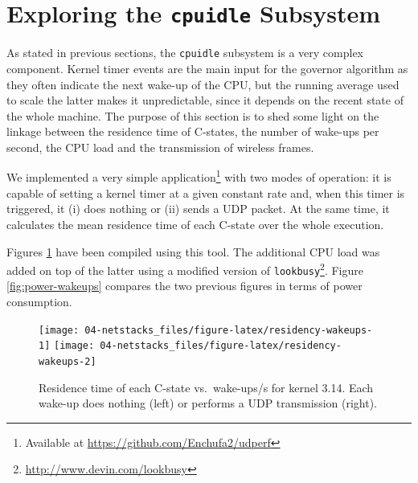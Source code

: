 \documentclass[twoside,nohyper]{tufte-book}
\theoremstyle{definition}
\theoremstyle{definition}
\theoremstyle{definition}
\theoremstyle{remark}
\begin{document}
\hypertarget{exploring-the-cpuidle-subsystem}{%
\section{\texorpdfstring{Exploring the \texttt{cpuidle}
Subsystem}{Exploring the cpuidle Subsystem}}\label{exploring-the-cpuidle-subsystem}}

As stated in previous sections, the \texttt{cpuidle} subsystem is a very
complex component. Kernel timer events are the main input for the
governor algorithm as they often indicate the next wake-up of the CPU,
but the running average used to scale the latter makes it unpredictable,
since it depends on the recent state of the whole machine. The purpose
of this section is to shed some light on the linkage between the
residence time of C-states, the number of wake-ups per second, the CPU
load and the transmission of wireless frames.

We implemented a very simple application\footnote{Available at
  \url{https://github.com/Enchufa2/udperf}} with two modes of operation:
it is capable of setting a kernel timer at a given constant rate and,
when this timer is triggered, it (i) does nothing or (ii) sends a UDP
packet. At the same time, it calculates the mean residence time of each
C-state over the whole execution.

Figures \ref{fig:residency-wakeups} have been compiled using this tool.
The additional CPU load was added on top of the latter using a modified
version of \texttt{lookbusy}\footnote{\url{http://www.devin.com/lookbusy}}.
Figure \ref{fig:power-wakeups} compares the two previous figures in
terms of power consumption.





\begin{figure}

{\centering \texttt{[image: 04-netstacks\_files/figure-latex/residency-wakeups-1]} \texttt{[image: 04-netstacks\_files/figure-latex/residency-wakeups-2]} 

}

\caption[Residence time of each C-state vs.~wake-ups/s
for kernel 3.14. Each wake-up does nothing (left) or performs a UDP
transmission (right).]{Residence time of each C-state vs.~wake-ups/s
for kernel 3.14. Each wake-up does nothing (left) or performs a UDP
transmission (right).}\label{fig:residency-wakeups}
\end{figure}
\end{document}
